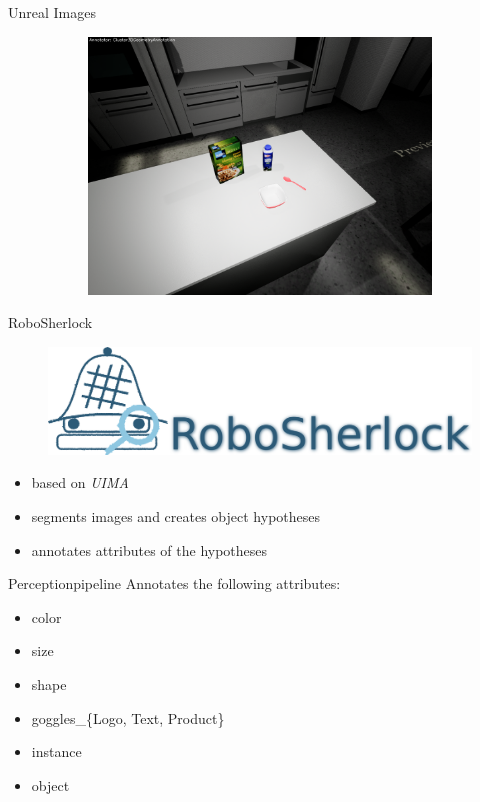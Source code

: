 \documentclass[]{beamer}
\begin{document}
\begin{frame}{Unreal Images}
\begin{figure}
\begin{subfigure}[b]{0.3\textwidth}
		\includegraphics[scale=.07]{../thesis/img/chapter3/sceneEx_5}	
	\end{subfigure}
\end{figure}
\end{frame}


\begin{frame}{RoboSherlock}
	\begin{figure}
		\includegraphics[scale=.3]{img/rs_logo_text.png}
	\end{figure}
	\begin{itemize}
		\item based on \textit{UIMA}
		\item segments images and creates object hypotheses
		\item annotates attributes of the hypotheses
	\end{itemize}	
\end{frame}

\begin{frame}{Perceptionpipeline}
Annotates the following attributes:
	\begin{itemize}
		\item color
		\item size
		\item shape
		\item goggles\_\{Logo, Text, Product\}
		\item instance
		\item object
	\end{itemize}
\end{frame}
\end{document}
